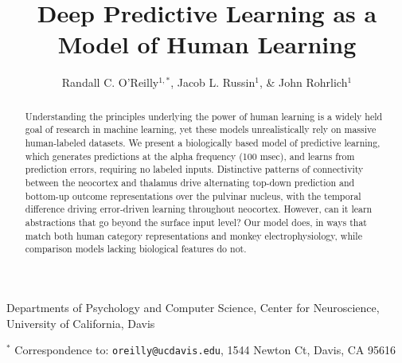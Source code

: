 \documentclass[12pt,twoside]{nature}
\title{ Deep Predictive Learning as a Model of Human Learning }
\author{Randall C. O'Reilly$^{1,\ast}$, Jacob L. Russin$^1$, \& John Rohrlich$^1$}
\newif\myifpdf
\begin{document}
\sloppy
\raggedbottom

\maketitle 

\begin{affiliations}
  \item Departments of Psychology and Computer Science, Center for Neuroscience, 
  University of California, Davis
  \item[$^\ast$]Correspondence to: \texttt{oreilly@ucdavis.edu}, 1544 Newton Ct,
  Davis, CA 95616
\end{affiliations}

\clearpage

\pagestyle{myheadings}

\begin{abstract}
Understanding the principles underlying the power of human learning is a widely held goal of research in machine learning, yet these models unrealistically rely on massive human-labeled datasets.  We present a biologically based model of predictive learning, which generates predictions at the alpha frequency (100 msec), and learns from prediction errors, requiring no labeled inputs.  Distinctive patterns of connectivity between the neocortex and thalamus drive alternating top-down prediction and bottom-up outcome representations over the pulvinar nucleus, with the temporal difference driving error-driven learning throughout neocortex.  However, can it learn abstractions that go beyond the surface input level?  Our model does, in ways that match both human category representations and monkey electrophysiology, while comparison models lacking biological features do not.
\end{abstract}
\end{document}
